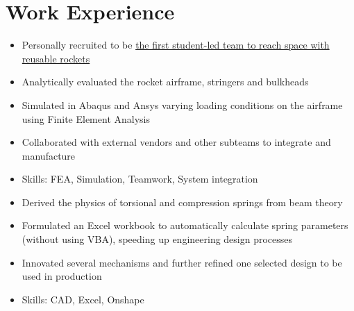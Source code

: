 \documentclass{cv}
\begin{document}
\section{Work Experience}
\begin{subsections}
    \subtitle{Karman Space Programme \hfill London, United Kingdom}
    \begin{itemize}
        \item Personally recruited to be \href{https://www.karmanspace.co.uk/}{the first student-led team to reach space with reusable rockets}
        \item Analytically evaluated the rocket airframe, stringers and bulkheads
        \item Simulated in Abaqus and Ansys varying loading conditions on the airframe using Finite Element Analysis
        \item Collaborated with external vendors and other subteams to integrate and manufacture
        \item Skills: FEA, Simulation, Teamwork, System integration
    \end{itemize}

    \subtitle{Guided Systems, DSO National Laboratories \hfill Singapore}
    \begin{itemize}
        \item Derived the physics of torsional and compression springs from beam theory
        \item Formulated an Excel workbook to automatically calculate spring parameters (without using VBA), speeding up engineering design processes
        \item Innovated several mechanisms and further refined one selected design to be used in production
        \item Skills: CAD, Excel, Onshape
    \end{itemize}


\end{subsections}
\end{document}
